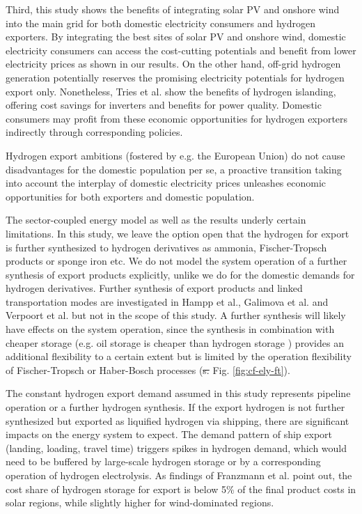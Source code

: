 \documentclass[5p,numafflabel]{elsarticle}
\providecommand{\DIFaddtex}[1]{{\protect\color{blue}\uwave{#1}}} %
\providecommand{\DIFdeltex}[1]{{\protect\color{red}\sout{#1}}}                      %
\providecommand{\DIFaddbegin}{} %
\providecommand{\DIFaddend}{} %
\providecommand{\DIFdelbegin}{} %
\providecommand{\DIFdelend}{} %
\providecommand{\DIFadd}[1]{\texorpdfstring{\DIFaddtex{#1}}{#1}} %
\providecommand{\DIFdel}[1]{\texorpdfstring{\DIFdeltex{#1}}{}} %
\newcommand{\DIFscaledelfig}{0.5}
\newlength{\DIFdelgraphicswidth} %
\newlength{\DIFdelgraphicsheight} %
\newcommand{\DIFaddincludegraphics}[2][]{{\color{blue}\fbox{\DIFOincludegraphics[#1]{#2}}}} %
\newcommand{\DIFdelincludegraphics}[2][]{%
\sbox{\DIFdelgraphicsbox}{\DIFOincludegraphics[#1]{#2}}%
\settoboxwidth{\DIFdelgraphicswidth}{\DIFdelgraphicsbox} %
\settoboxtotalheight{\DIFdelgraphicsheight}{\DIFdelgraphicsbox} %
\scalebox{\DIFscaledelfig}{%
\parbox[b]{\DIFdelgraphicswidth}{\usebox{\DIFdelgraphicsbox}\\[-\baselineskip] \rule{\DIFdelgraphicswidth}{0em}}\llap{\resizebox{\DIFdelgraphicswidth}{\DIFdelgraphicsheight}{%
\setlength{\unitlength}{\DIFdelgraphicswidth}%
\begin{picture}(1,1)%
\thicklines\linethickness{2pt} %
{\color[rgb]{1,0,0}\put(0,0){\framebox(1,1){}}}%
{\color[rgb]{1,0,0}\put(0,0){\line( 1,1){1}}}%
{\color[rgb]{1,0,0}\put(0,1){\line(1,-1){1}}}%
\end{picture}%
}\hspace*{3pt}}} %
} %
\DeclareRobustCommand{\DIFaddbegin}{\DIFOaddbegin \let\includegraphics\DIFaddincludegraphics} %
\DeclareRobustCommand{\DIFaddend}{\DIFOaddend \let\includegraphics\DIFOincludegraphics} %
\DeclareRobustCommand{\DIFdelbegin}{\DIFOdelbegin \let\includegraphics\DIFdelincludegraphics} %
\DeclareRobustCommand{\DIFdelend}{\DIFOaddend \let\includegraphics\DIFOincludegraphics} %
\begin{document}
Third, this study shows the benefits of integrating solar PV and onshore wind into the main grid for both domestic electricity consumers and hydrogen exporters. By integrating the best sites of solar PV and onshore wind, domestic electricity consumers can access the cost-cutting potentials and benefit from lower electricity prices as shown in our results. On the other hand, off-grid hydrogen generation potentially reserves the promising electricity potentials for hydrogen export only. Nonetheless, Tries et al.\cite{Tries2023b} show the benefits of hydrogen islanding, offering cost savings for inverters and benefits for power quality. Domestic consumers may profit from these economic opportunities for hydrogen exporters indirectly through corresponding policies.

Hydrogen export ambitions (fostered by e.g. the European Union) do not cause disadvantages for the domestic population per se, a proactive transition taking into account the interplay of domestic electricity prices unleashes economic opportunities for both exporters and domestic population.




The sector-coupled energy model as well as the results underly certain limitations. In this study, we leave the option open that the hydrogen for export is further synthesized to hydrogen derivatives as ammonia, Fischer-Tropsch products or sponge iron etc. We do not model the system operation of a further synthesis of export products explicitly, unlike we do for the domestic demands for hydrogen derivatives. Further synthesis of export products and linked transportation modes are investigated in Hampp et al.\cite{Hampp2023}, Galimova et al.\cite{Galimova2023} and Verpoort et al.\cite{Verpoort2023} but not in the scope of this study.
A further synthesis will likely have effects on the system operation, since the synthesis in combination with cheaper storage (e.g. oil storage is cheaper than hydrogen storage \cite{DEA2019TechnologyData}) provides an additional flexibility to a certain extent but is limited by the operation flexibility of Fischer-Tropsch or Haber-Bosch processes (\DIFdelbegin \DIFdel{s. }\DIFdelend \DIFaddbegin \DIFadd{see Supplementary }\DIFaddend Fig. \ref{fig:cf-ely-ft}).

The constant hydrogen export demand assumed in this study represents pipeline operation or a further hydrogen synthesis.
If the export hydrogen is not further synthesized but exported as liquified hydrogen via shipping, there are significant impacts on the energy system to expect. The demand pattern of ship export (landing, loading, travel time) triggers spikes in hydrogen demand, which would need to be buffered by large-scale hydrogen storage or by a corresponding operation of hydrogen electrolysis. As findings of Franzmann et al. \cite{Franzmann2023} point out, the cost share of hydrogen storage for export is below 5\% of the final product costs in solar regions, while slightly higher for wind-dominated regions.
\end{document}

